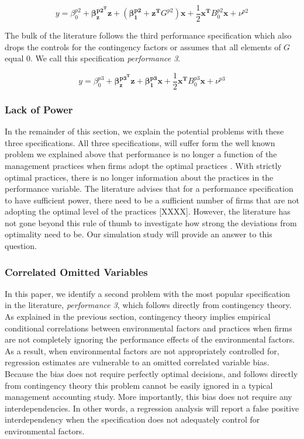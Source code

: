 \documentclass[12pt]{article}
\begin{document}
\begin{equation*}
    y = \beta_0^{p2} + \mathbf{\beta_z^{p2^T} z} + (\mathbf{\beta_1^{p2}} + \mathbf{z^T} G^{p2}) \mathbf{x} + 
    \frac{1}{2}\mathbf{x^T} B_0^{p2} \mathbf{x} + \nu^{p2}
\end{equation*}

The bulk of the literature follows the third performance specification which also drops the controls for the contingency factors or assumes that all elements of $G$ equal $0$. We call this specification \emph{performance 3}.

\begin{equation*}
    y = \beta_0^{p3} + \mathbf{\beta_z^{p3^T} z} + \mathbf{\beta_1^{p3}} \mathbf{x} + 
    \frac{1}{2}\mathbf{x^T} B_0^{p3} \mathbf{x} + \nu^{p3}
\end{equation*}

\subsubsection{Lack of Power}

In the remainder of this section, we explain the potential problems with these three specifications. All three specifications, will suffer form the well known problem we explained above that performance is no longer a function of the management practices when firms adopt the optimal practices \citep{Grabner2013}. With strictly optimal practices, there is no longer information about the practices in the performance variable. The literature advises that for a performance specification to have sufficient power, there need to be a sufficient number of firms that are not adopting the optimal level of the practices [XXXX]. However, the literature has not gone beyond this rule of thumb to investigate how strong the deviations from optimality need to be. Our simulation study will provide an answer to this question.

\subsubsection{Correlated Omitted Variables}

In this paper, we identify a second problem with the most popular specification in the literature, \emph{performance 3}, which follows directly from contingency theory. As explained in the previous section, contingency theory implies empirical conditional correlations between environmental factors and practices when firms are not completely ignoring the performance effects of the environmental factors. As a result, when environmental factors are not appropriately controlled for, regression estimates are vulnerable to an omitted correlated variable bias. Because the bias does not require perfectly optimal decisions, and follows directly from contingency theory this problem cannot be easily ignored in a typical management accounting study. More importantly, this bias does not require any interdependencies. In other words, a regression analysis will report a false positive interdependency when the specification does not adequately control for environmental factors. 
\end{document}
